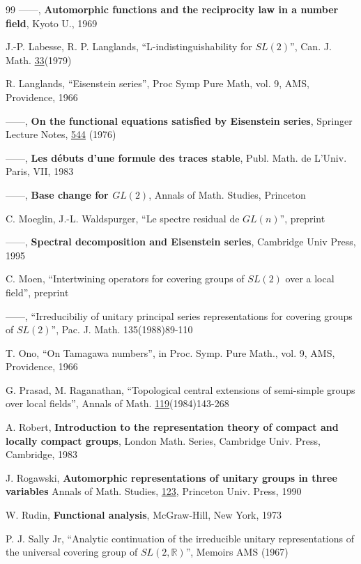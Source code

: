 \begin{thebibliography}{99}
 ------, {\bf Automorphic functions and the reciprocity
law in a number field}, Kyoto U., 1969

J.-P. Labesse, R. P. Langlands, ``L-indistinguishability for $SL(2)$'',
Can. J. Math. \underline{33}(1979)

 R. Langlands, ``Eisenstein series'', Proc Symp Pure Math,
vol. 9, AMS,
Providence, 1966

 ------, {\bf On the functional equations satisfied
by Eisenstein series}, Springer Lecture Notes, \underline{544} (1976)

 ------, {\bf Les d\'ebuts d'une formule des traces 
stable}, Publ. Math. de L'Univ. Paris, VII, 1983

 ------, {\bf Base change for $GL(2)$},
Annals of Math. Studies, Princeton

 C. Moeglin, J.-L. Waldspurger,
``Le spectre residual de $GL(n)$'', preprint

 ------,
{\bf Spectral decomposition and Eisenstein series},
Cambridge Univ Press, 1995

 C. Moen, ``Intertwining operators for covering groups
of $SL(2)$ over
a local field'', preprint

 ------, ``Irreducibiliy of unitary principal series
representations
for covering groups of $SL(2)$'', Pac. J. Math. 135(1988)89-110

 T. Ono, ``On Tamagawa numbers'', in Proc. Symp. Pure Math.,
vol. 9, AMS,
Providence, 1966

 G. Prasad, M. Raganathan,
``Topological central extensions of
semi-simple groups over local fields'', Annals of Math.
\underline{119}(1984)143-268

 A. Robert, {\bf Introduction to the
representation theory of compact and locally compact groups},
London Math. Series, Cambridge Univ. Press, Cambridge, 1983

 J. Rogawski,
{\bf Automorphic representations of unitary groups
in three variables}
Annals of Math. Studies, \underline{123}, Princeton Univ. Press, 1990

 W. Rudin, {\bf Functional analysis}, 
McGraw-Hill, New
York, 1973

P. J. Sally Jr, ``Analytic continuation of the irreducible unitary
representations of the universal covering group
of $SL(2,{\mathbb{R}})$'', Memoirs AMS (1967)


\end{thebibliography}
